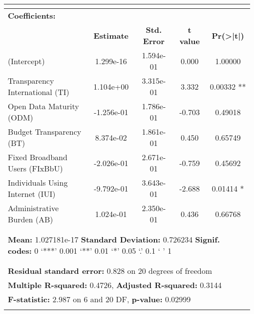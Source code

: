 \documentclass[a4paper, twoside]{report}
\begin{document}
\begin{landscape}
\begin{table}[htbp]
\begin{adjustbox}{max width=\linewidth}
\begin{tabular}{lllllllllll}
    \midrule
    \multicolumn{10}{c}{}                                                         &  \\
    \midrule
    \multicolumn{11}{l}{\textbf{Coefficients:}} \\
          & \multicolumn{2}{c}{\textbf{Estimate}} & \multicolumn{2}{c}{\textbf{Std. Error}} & \multicolumn{2}{c}{\textbf{t value}} & \multicolumn{4}{c}{\textbf{Pr(>|t|)   }} \\
    (Intercept) & \multicolumn{2}{c}{1.299e-16} & \multicolumn{2}{c}{1.594e-01} & \multicolumn{2}{c}{0.000 } & \multicolumn{4}{c}{1.00000   } \\
    Transparency International  (TI) & \multicolumn{2}{c}{1.104e+00} & \multicolumn{2}{c}{3.315e-01} & \multicolumn{2}{c}{3.332} & \multicolumn{4}{c}{  0.00332 **} \\
    Open Data Maturity (ODM) & \multicolumn{2}{c}{-1.256e-01} & \multicolumn{2}{c}{1.786e-01  } & \multicolumn{2}{c}{-0.703 } & \multicolumn{4}{c}{ 0.49018   } \\
    Budget Transparency (BT) & \multicolumn{2}{c}{8.374e-02} & \multicolumn{2}{c}{1.861e-01} & \multicolumn{2}{c}{0.450 } & \multicolumn{4}{c}{0.65749   } \\
    Fixed Broadband Users (FIxBbU) & \multicolumn{2}{c}{-2.026e-01} & \multicolumn{2}{c}{2.671e-01  } & \multicolumn{2}{c}{-0.759  } & \multicolumn{4}{c}{0.45692   } \\
    Individuals Using Internet (IUI) & \multicolumn{2}{c}{-9.792e-01} & \multicolumn{2}{c}{3.643e-01} & \multicolumn{2}{c}{-2.688} & \multicolumn{4}{c}{ 0.01414 * } \\
    Administrative Burden (AB) & \multicolumn{2}{c}{1.024e-01} & \multicolumn{2}{c}{2.350e-01} & \multicolumn{2}{c}{0.436} & \multicolumn{4}{c}{ 0.66768   } \\
    \multicolumn{11}{c}{} \\
    \midrule
    \multicolumn{11}{c}{} \\
    \midrule
    \multicolumn{11}{l}{\hfill \textbf{Mean:} 1.027181e-17 \hfill   \textbf{Standard Deviation:} 0.726234  \hfill  \textbf{Signif. codes:}  0 ‘***’ 0.001 ‘**’ 0.01 ‘*’ 0.05 ‘.’ 0.1 ‘ ’ 1 \hfill} \\
    \midrule
    \multicolumn{11}{c}{} \\
    \midrule
    \multicolumn{11}{c}{} \\
    \multicolumn{11}{l}{\textbf{Residual standard error:} 0.828 on 20 degrees of freedom} \\
    \multicolumn{11}{l}{\textbf{Multiple R-squared:} 0.4726, \textbf{Adjusted R-squared:} 0.3144 } \\
    \multicolumn{11}{l}{\textbf{F-statistic:}  2.987 on 6 and 20 DF,  \textbf{p-value:} 0.02999} \\
    \multicolumn{11}{l}{} \\
    \bottomrule
    \end{tabular}%
    \end{adjustbox}
  \label{tab:multiple_regression_27}%
\end{table}%
\end{landscape}
\end{document}
